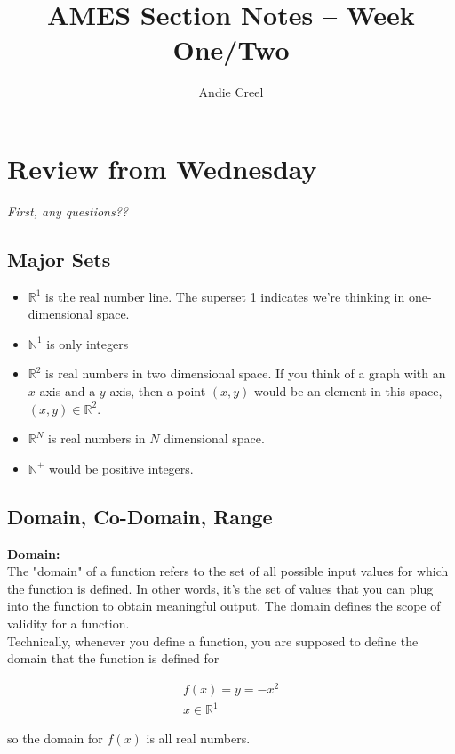 \documentclass{article}
\title{AMES Section Notes -- Week One/Two }
\author{Andie Creel}
\begin{document}
\maketitle

\section{Review from Wednesday}

\textit{First, any questions??
}
\subsection{Major Sets}
\begin{itemize}
    \item $\mathbb{R}^1$ is the real number line. The superset 1 indicates we're thinking in one-dimensional space. 
    \item $\mathbb{N}^1$ is only integers 
    \item $\mathbb{R}^2$ is real numbers in two dimensional space. If you think of a graph with an $x$ axis and a $y$ axis, then a point $(x,y)$ would be an element in this space, $(x,y) \in \mathbb{R}^2$.
    \item $\mathbb{R}^N$ is real numbers in $N$ dimensional space. 
    \item $\mathbb{N}^+$ would be positive integers. 
\end{itemize}

\subsection{Domain, Co-Domain, Range}

\textbf{Domain:}\\
The "domain" of a function refers to the set of all possible input values for which the function is defined. In other words, it's the set of values that you can plug into the function to obtain meaningful output. The domain defines the scope of validity for a function.\\

Technically, whenever you define a function, you are supposed to define the domain that the function is defined for 

\begin{align*}
    f(x) = y = -x^2  \\
    x \in \mathbb{R}^1
\end{align*}

so the domain for $f(x)$ is all real numbers. \\
\end{document}
